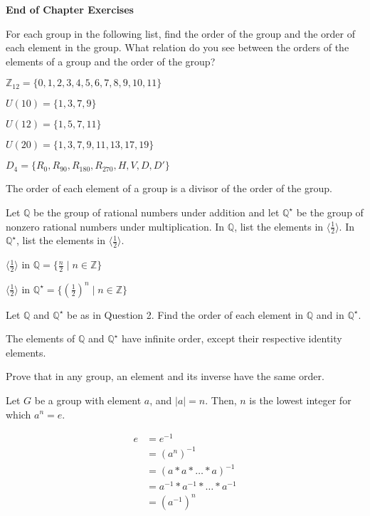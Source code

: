 \documentclass[11pt,largemargins]{homework}
\begin{document}
\hfill

\textbf{\large{End of Chapter Exercises}}

\question
For each group in the following list, find the order of the group and the order of each element in the group.
What relation do you see between the orders of the elements of a group and the order of the group?

\begin{alphaparts}
    \questionpart
    $\mathbb{Z}_{12} = \{0,1,2,3,4,5,6,7,8,9,10,11\}$ 

    \questionpart
    $U(10) = \{1,3,7,9\}$

    \questionpart
    $U(12) = \{1,5,7,11\}$

    \questionpart
    $U(20) = \{1,3,7,9,11,13,17,19\}$

    \questionpart
    $D_4 = \{R_0,R_{90},R_{180},R_{270},H, V, D, D'\}$

\end{alphaparts}

\quad The order of each element of a group is a divisor of the order of the group.

\question
Let $\mathbb{Q}$ be the group of rational numbers under addition and let $\mathbb{Q}^{\star}$ be the group of nonzero rational numbers under 
multiplication. In $\mathbb{Q}$, list the elements in $\langle \frac{1}{2} \rangle$. In $\mathbb{Q}^{\star}$, list the elements 
in $\langle \frac{1}{2} \rangle$.

\quad $\langle \frac{1}{2} \rangle$ in $\mathbb{Q} = \{ \frac{n}{2} \;|\; n\in\mathbb{Z}\}$

\quad $\langle \frac{1}{2} \rangle$ in $\mathbb{Q}^{\star} = \{ \left( \frac{1}{2}\right)^n  \;|\; n\in\mathbb{Z}\}$

\question
Let $\mathbb{Q}$ and $\mathbb{Q}^{\star}$ be as in Question 2. Find the order of each element in $\mathbb{Q}$ 
and in $\mathbb{Q}^{\star}$.

\quad The elements of $\mathbb{Q}$ and $\mathbb{Q}^{\star}$ have infinite order, except their respective identity elements.

\question
Prove that in any group, an element and its inverse have the same order.

\quad Let $G$ be a group with element $a$, and $|a| = n$. Then, $n$ is the lowest integer for which $a^n=e$.

\begin{align*}
    e &= e^{-1}\\
      &= (a^n)^{-1}\\
      &= (a*a*\dots*a)^{-1}\\
      &= a^{-1}*a^{-1}*\dots*a^{-1}\\
      &= (a^{-1})^n
\end{align*}
\end{document}
